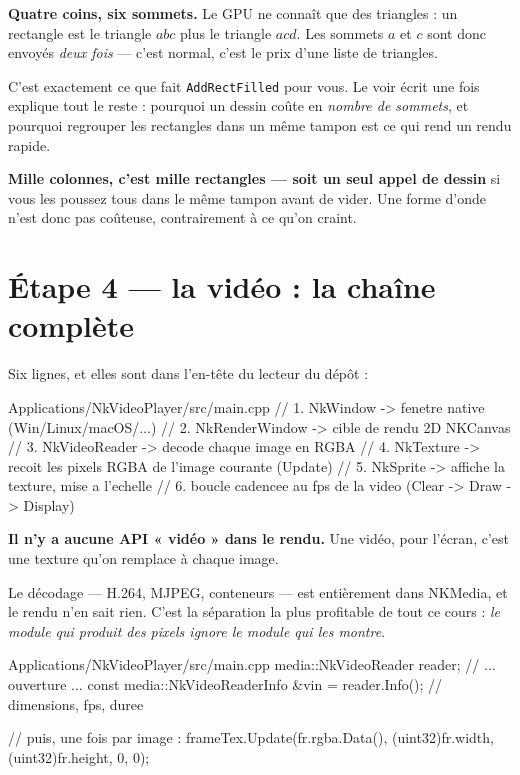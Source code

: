 \begin{nkretenir}
\textbf{Quatre coins, six sommets.} Le GPU ne connaît que des triangles : un
rectangle est le triangle $abc$ plus le triangle $acd$. Les sommets $a$ et $c$
sont donc envoyés \emph{deux fois} --- c'est normal, c'est le prix d'une liste de
triangles.

C'est exactement ce que fait \texttt{AddRectFilled} pour vous. Le voir écrit une
fois explique tout le reste : pourquoi un dessin coûte en \emph{nombre de
sommets}, et pourquoi regrouper les rectangles dans un même tampon est ce qui
rend un rendu rapide.
\end{nkretenir}

\begin{nkretenir}
\textbf{Mille colonnes, c'est mille rectangles --- soit un seul appel de dessin}
si vous les poussez tous dans le même tampon avant de vider. Une forme d'onde
n'est donc pas coûteuse, contrairement à ce qu'on craint.
\end{nkretenir}

\section{Étape 4 --- la vidéo : la chaîne complète}

Six lignes, et elles sont dans l'en-tête du lecteur du dépôt :

\begin{nkcode}{Applications/NkVideoPlayer/src/main.cpp}
//   1. NkWindow          -> fenetre native (Win/Linux/macOS/...)
//   2. NkRenderWindow    -> cible de rendu 2D NKCanvas
//   3. NkVideoReader     -> decode chaque image en RGBA
//   4. NkTexture         -> recoit les pixels RGBA de l'image courante (Update)
//   5. NkSprite          -> affiche la texture, mise a l'echelle
//   6. boucle cadencee au fps de la video (Clear -> Draw -> Display)
\end{nkcode}

\begin{nkretenir}
\textbf{Il n'y a aucune API « vidéo » dans le rendu.} Une vidéo, pour l'écran,
c'est une texture qu'on remplace à chaque image.

Le décodage --- H.264, MJPEG, conteneurs --- est entièrement dans NKMedia, et le
rendu n'en sait rien. C'est la séparation la plus profitable de tout ce cours :
\emph{le module qui produit des pixels ignore le module qui les montre}.
\end{nkretenir}

\begin{nkcode}{Applications/NkVideoPlayer/src/main.cpp}
media::NkVideoReader reader;
// ... ouverture ...
const media::NkVideoReaderInfo &vin = reader.Info();   // dimensions, fps, duree

// puis, une fois par image :
frameTex.Update(fr.rgba.Data(), (uint32)fr.width, (uint32)fr.height, 0, 0);
\end{nkcode}

